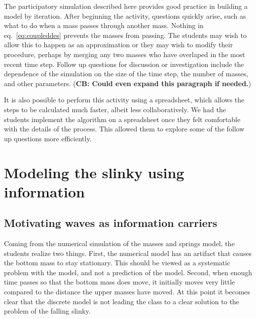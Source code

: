 \documentclass[aps,pre,10pt,superscriptaddress,showpacs,amsmath,amssymb,nofootinbib]{revtex4-1}
\newcommand{\NOTE}[1]{\marginpar{\footnotesize\textbf{NOTE}} (\textbf{#1})}
\newcommand{\eq}[1]{eq.~\eqref{eq:#1}}
\begin{document}

The participatory simulation described here provides good practice in building
a model by iteration. After beginning the activity, questions quickly arise, such
as what to do when a mass passes through another mass. Nothing in \eq{coupleddes} prevents
the masses from passing. The students may wish to allow this to happen as an approximation
or they may wish to modify their procedure, perhaps by merging any two masses who have overlaped
in the most recent time step. Follow up questions for discussion or investigation include
the dependence of the simulation on the size of the time step, the number of masses,
and other parameters.\NOTE{CB: Could even expand this paragraph if needed.}

It is also possible to perform this activity using a spreadsheet, which allows the steps to be
calculated much faster, albeit less collaboratively. We had the students implement the algorithm on a spreadsheet once they
felt comfortable with the details of the process. This allowed them to explore some of the follow
up questions more efficiently.

\section{Modeling the slinky using information}
\label{sec:information}
\subsection{Motivating waves as information carriers}        
Coming from the numerical simulation of the masses and springs model, the students realize
two things. First, the numerical model has an artifact that causes the bottom mass to stay stationary.
This should be viewed as a systematic problem with the model, and not a prediction of the model.
Second, when enough time passes so that the bottom mass does move, it initially moves very little compared 
to the distance the upper masses have moved. At this point it becomes clear that the discrete model
is not leading the class to a clear solution to the problem of the falling slinky.
\end{document}
